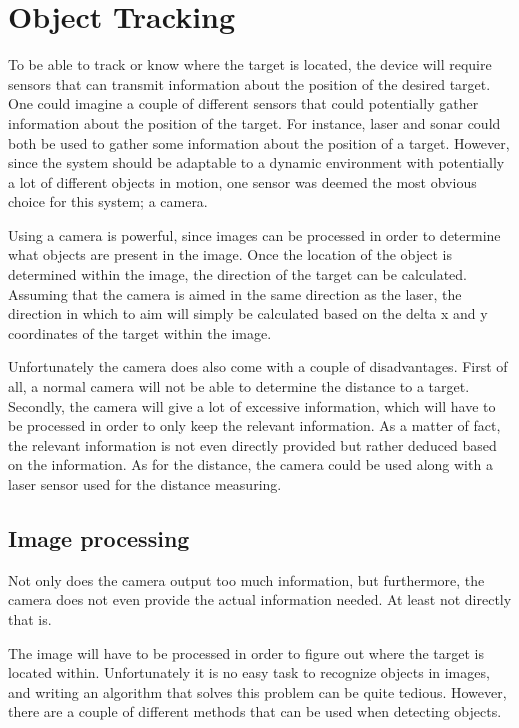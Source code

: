 \section{Object Tracking}

To be able to track or know where the target is located, the device will require sensors that can transmit information about the position of the desired target.
One could imagine a couple of different sensors that could potentially gather information about the position of the target.
For instance, laser and sonar could both be used to gather some information about the position of a target\cite{Sensors}.
However, since the system should be adaptable to a dynamic environment with potentially a lot of different objects in motion, one sensor was deemed the most obvious choice for this system; a camera.

Using a camera is powerful, since images can be processed in order to determine what objects are present in the image.
Once the location of the object is determined within the image, the direction of the target can be calculated.
Assuming that the camera is aimed in the same direction as the laser, the direction in which to aim will simply be calculated based on the delta x and y coordinates of the target within the image.

Unfortunately the camera does also come with a couple of disadvantages.
First of all, a normal camera will not be able to determine the distance to a target.
Secondly, the camera will give a lot of excessive information, which will have to be processed in order to only keep the relevant information. 
As a matter of fact, the relevant information is not even directly provided but rather deduced based on the information.
As for the distance, the camera could be used along with a laser sensor used for the distance measuring\cite{Sensors}.

\subsection{Image processing}
Not only does the camera output too much information, but furthermore, the camera does not even provide the actual information needed.
At least not directly that is.

The image will have to be processed in order to figure out where the target is located within.
Unfortunately it is no easy task to recognize objects in images, and writing an algorithm that solves this problem can be quite tedious.
However, there are a couple of different methods that can be used when detecting objects.

